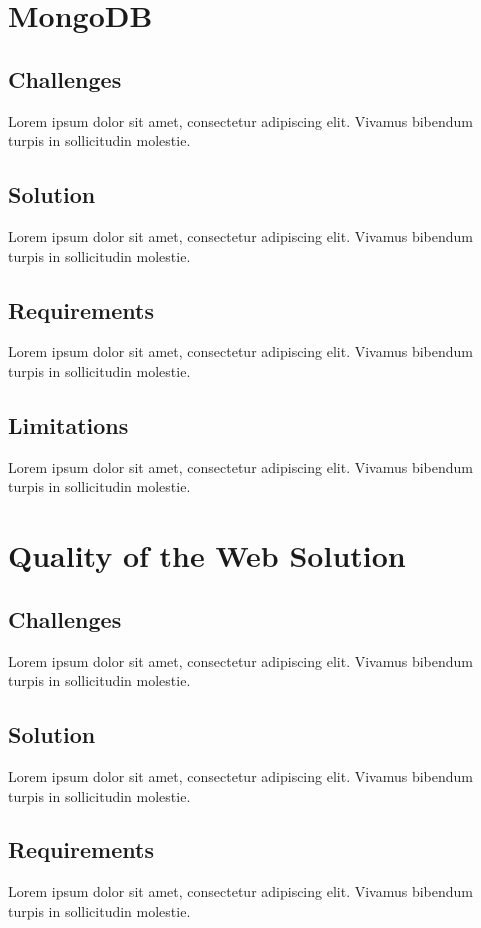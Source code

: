 \documentclass[11pt, a4paper]{article}
\begin{document}
\section{MongoDB}
\subsection{Challenges}
Lorem ipsum dolor sit amet, consectetur adipiscing elit. Vivamus bibendum turpis in sollicitudin
molestie.

\subsection{Solution}
Lorem ipsum dolor sit amet, consectetur adipiscing elit. Vivamus bibendum turpis in sollicitudin
molestie.

\subsection{Requirements}
Lorem ipsum dolor sit amet, consectetur adipiscing elit. Vivamus bibendum turpis in sollicitudin
molestie.

\subsection{Limitations}
Lorem ipsum dolor sit amet, consectetur adipiscing elit. Vivamus bibendum turpis in sollicitudin
molestie.

\section{Quality of the Web Solution}
\subsection{Challenges}
Lorem ipsum dolor sit amet, consectetur adipiscing elit. Vivamus bibendum turpis in sollicitudin
molestie.

\subsection{Solution}
Lorem ipsum dolor sit amet, consectetur adipiscing elit. Vivamus bibendum turpis in sollicitudin
molestie.

\subsection{Requirements}
Lorem ipsum dolor sit amet, consectetur adipiscing elit. Vivamus bibendum turpis in sollicitudin
molestie.
\end{document}
